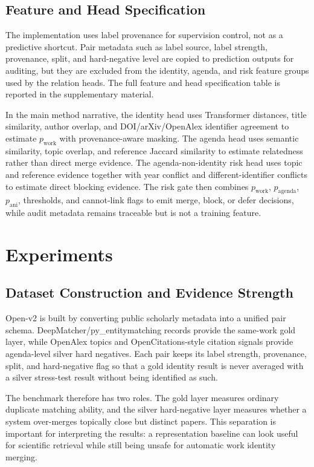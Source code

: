\documentclass[preprint,12pt]{elsarticle}
\begin{document}
\subsection{Feature and Head Specification}

The implementation uses label provenance for supervision control, not as a predictive shortcut. Pair metadata such as label source, label strength, provenance, split, and hard-negative level are copied to prediction outputs for auditing, but they are excluded from the identity, agenda, and risk feature groups used by the relation heads. The full feature and head specification table is reported in the supplementary material.

In the main method narrative, the identity head uses Transformer distances, title similarity, author overlap, and DOI/arXiv/OpenAlex identifier agreement to estimate $p_{\mathrm{work}}$ with provenance-aware masking. The agenda head uses semantic similarity, topic overlap, and reference Jaccard similarity to estimate relatedness rather than direct merge evidence. The agenda-non-identity risk head uses topic and reference evidence together with year conflict and different-identifier conflicts to estimate direct blocking evidence. The risk gate then combines $p_{\mathrm{work}}$, $p_{\mathrm{agenda}}$, $p_{\mathrm{ani}}$, thresholds, and cannot-link flags to emit merge, block, or defer decisions, while audit metadata remains traceable but is not a training feature.

\section{Experiments}

\subsection{Dataset Construction and Evidence Strength}

Open-v2 is built by converting public scholarly metadata into a unified pair schema. DeepMatcher/py\_entitymatching records provide the same-work gold layer, while OpenAlex topics and OpenCitations-style citation signals provide agenda-level silver hard negatives. Each pair keeps its label strength, provenance, split, and hard-negative flag so that a gold identity result is never averaged with a silver stress-test result without being identified as such.

The benchmark therefore has two roles. The gold layer measures ordinary duplicate matching ability, and the silver hard-negative layer measures whether a system over-merges topically close but distinct papers. This separation is important for interpreting the results: a representation baseline can look useful for scientific retrieval while still being unsafe for automatic work identity merging.
\end{document}
